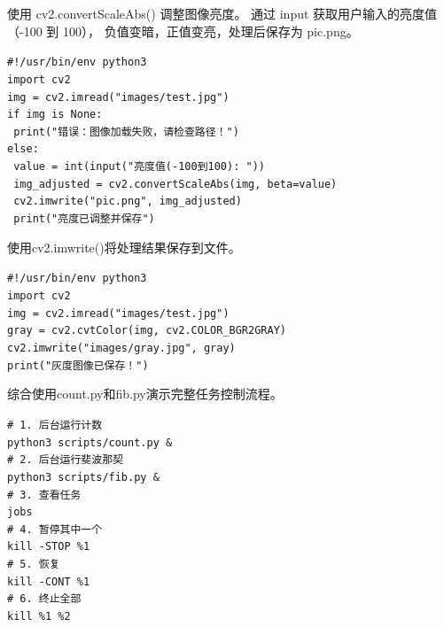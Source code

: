 \documentclass[a4paper, 12pt]{article}
\begin{document}
\begin{tcolorbox}[instancestyle, title=实例18：图像亮度调整]
使用 cv2.convertScaleAbs() 调整图像亮度。
通过 input 获取用户输入的亮度值（-100 到 100），
负值变暗，正值变亮，处理后保存为 pic.png。

\texttt{\#!/usr/bin/env python3} \\
\texttt{import cv2} \\
\texttt{img = cv2.imread("images/test.jpg")} \\
\texttt{if img is None:} \\
\texttt{    print("错误：图像加载失败，请检查路径！")} \\
\texttt{else:} \\
\texttt{    value = int(input("亮度值(-100到100): "))} \\
\texttt{    img\_adjusted = cv2.convertScaleAbs(img, beta=value)} \\
\texttt{    cv2.imwrite("pic.png", img\_adjusted)} \\
\texttt{    print("亮度已调整并保存")}
\end{tcolorbox}

\begin{tcolorbox}[instancestyle, title=实例19：保存处理后的图像]
使用cv2.imwrite()将处理结果保存到文件。

\texttt{\#!/usr/bin/env python3} \\
\texttt{import cv2} \\
\texttt{img = cv2.imread("images/test.jpg")} \\
\texttt{gray = cv2.cvtColor(img, cv2.COLOR_BGR2GRAY)} \\
\texttt{cv2.imwrite("images/gray.jpg", gray)} \\
\texttt{print("灰度图像已保存！")}
\end{tcolorbox}

\begin{tcolorbox}[instancestyle, title=实例20：综合任务控制演示]
综合使用count.py和fib.py演示完整任务控制流程。

\texttt{\# 1. 后台运行计数} \\
\texttt{python3 scripts/count.py \&} \\
\texttt{\# 2. 后台运行斐波那契} \\
\texttt{python3 scripts/fib.py \&} \\
\texttt{\# 3. 查看任务} \\
\texttt{jobs} \\
\texttt{\# 4. 暂停其中一个} \\
\texttt{kill -STOP \%1} \\
\texttt{\# 5. 恢复} \\
\texttt{kill -CONT \%1} \\
\texttt{\# 6. 终止全部} \\
\texttt{kill \%1 \%2}
\end{tcolorbox}
\end{document}
